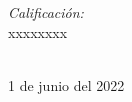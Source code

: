 \documentclass[a4paper,12pt]{report}
\begin{document}
\begin{titlepage}
\begin{center}
  \begin{flushleft} \large
    \emph{\color{orange!80!black}Calificación:}\\
    xxxxxxxx\\
  \end{flushleft}


\vfill

{\large \color{orange!80!black}{UANL}\\ \color{blue!80!black}1 de junio del 2022}

\end{center}
\end{titlepage}
\end{document}
